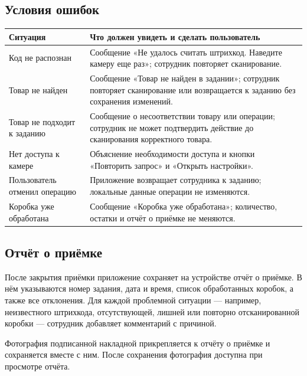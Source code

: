\subsection{Условия ошибок}

\begin{tabularx}{\textwidth}{L{50mm}Y}
\toprule
\textbf{Ситуация} & \textbf{Что должен увидеть и сделать пользователь} \\
\midrule
Код не распознан & Сообщение «Не удалось считать штрихкод. Наведите камеру еще раз»; сотрудник повторяет сканирование. \\
Товар не найден & Сообщение «Товар не найден в задании»; сотрудник повторяет сканирование или возвращается к заданию без сохранения изменений. \\
Товар не подходит к заданию & Сообщение о несоответствии товару или операции; сотрудник не может подтвердить действие до сканирования корректного товара. \\
Нет доступа к камере & Объяснение необходимости доступа и кнопки «Повторить запрос» и «Открыть настройки». \\
Пользователь отменил операцию & Приложение возвращает сотрудника к заданию; локальные данные операции не изменяются. \\
Коробка уже обработана & Сообщение «Коробка уже обработана»; количество, остатки и отчёт о приёмке не меняются. \\
\bottomrule
\end{tabularx}

\subsection{Отчёт о приёмке}

После закрытия приёмки приложение сохраняет на устройстве отчёт о приёмке. В нём указываются номер задания, дата и время, список обработанных коробок, а также все отклонения. Для каждой проблемной ситуации --- например, неизвестного штрихкода, отсутствующей, лишней или повторно отсканированной коробки --- сотрудник добавляет комментарий с причиной.

Фотография подписанной накладной прикрепляется к отчёту о приёмке и сохраняется вместе с ним. После сохранения фотография доступна при просмотре отчёта.
